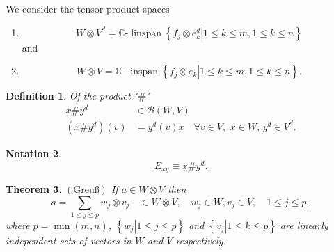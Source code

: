 \documentclass[aps,preprint]{revtex4}%
\newtheorem{theorem}{Theorem}
\newtheorem{definition}[theorem]{Definition}
\newtheorem{notation}[theorem]{Notation}
\begin{document}
We consider the tensor product spaces

\begin{enumerate}
\item
\begin{equation}
W\otimes V^{d}=\mathbb{C}\text{-}\operatorname*{linspan}\left\{  \left.
f_{j}\otimes e_{k}^{d}\right\vert 1\leq k\leq m,1\leq k\leq n\right\}
\end{equation}
and

\item
\begin{equation}
W\otimes V=\mathbb{C}\text{-}\operatorname*{linspan}\left\{  \left.
f_{j}\otimes e_{k}\right\vert 1\leq k\leq m,1\leq k\leq n\right\}  .
\end{equation}

\end{enumerate}

\begin{definition}
Of the product "$\#$"
\begin{align}
x\#y^{d}  &  \in\mathcal{B}\left(  W,V\right) \\
\left(  x\#y^{d}\right)  \left(  v\right)   &  =y^{d}\left(  v\right)
x\quad\forall v\in V,\,\,x\in W,\,y^{d}\in V^{d}.
\end{align}

\end{definition}

\begin{notation}%
\begin{equation}
E_{xy}\equiv x\#y^{d}.
\end{equation}

\end{notation}

\begin{theorem}
\label{GreuB Theorem} $\left(  \text{Greu\ss }\right)  $ If $a\in W\otimes V$
then
\begin{equation}
a=\sum_{1\leq j\leq p}w_{j}\otimes v_{j}\quad\in W\otimes V,\quad w_{j}\in
W,v_{j}\in V,\mathcal{\quad}1\leq j\leq p,
\end{equation}
where $p=\min\left(  m,n\right)  $, $\left\{  \left.  w_{j}\right\vert 1\leq
j\leq p\right\}  $ and $\left\{  \left.  v_{j}\right\vert 1\leq k\leq
p\right\}  $ are linearly independent sets of vectors in $W$ and $V$ respectively.
\end{theorem}
\end{document}
